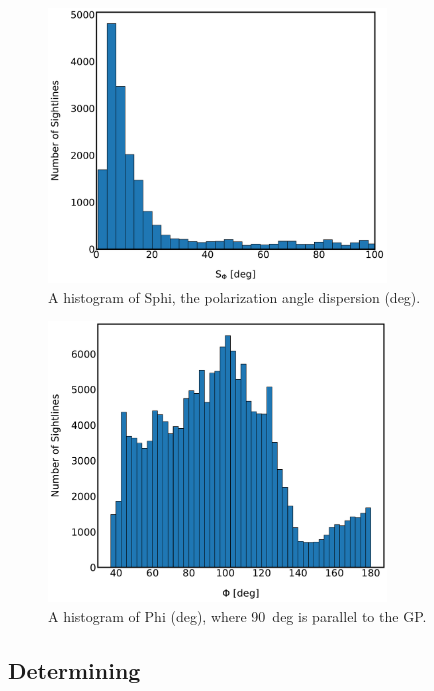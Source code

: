 \begin{figure}[!htbp]
\centering
\includegraphics[width=0.8\textwidth]{figures/carina/S_hist}
\caption[~A histogram of the dispersion in polarization angle.]{A histogram of \gls{Sphi}, the polarization angle dispersion (deg).}
\label{fig:S_hist}
\end{figure}

\begin{figure}[!htbp]
\centering
\includegraphics[width=0.8\textwidth]{figures/carina/Phi_hist}
\caption[~A histogram of the polarization angle.]{A histogram of \gls{Phi} (deg), where 90~deg is parallel to the GP.}
\label{fig:Phi_hist}
\end{figure}

\subsection{Determining }\label{nh2}

